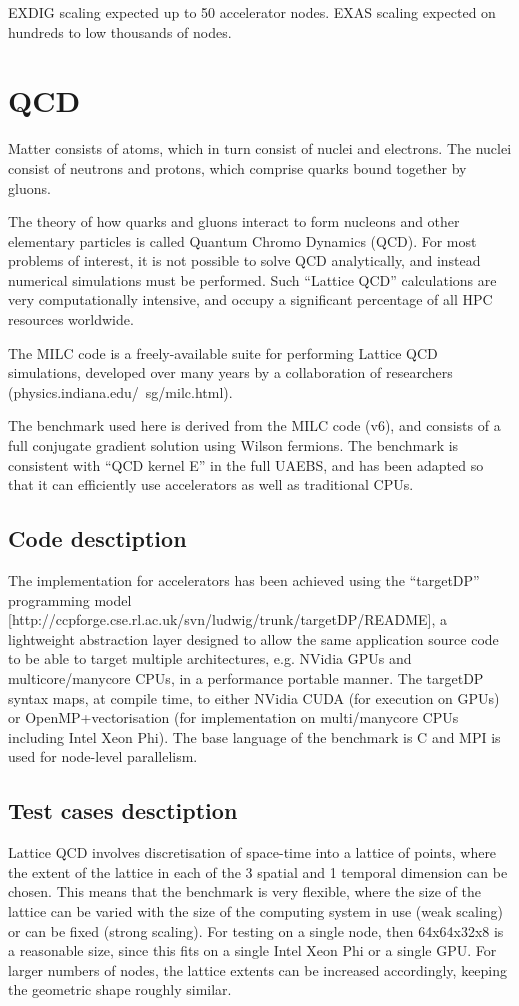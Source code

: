 EXDIG scaling expected up to 50 accelerator nodes. EXAS scaling expected on hundreds to low thousands of nodes.

\section{QCD}

Matter consists of atoms, which in turn consist of nuclei and electrons. The nuclei consist of neutrons and protons, which comprise quarks bound together by gluons.

The theory of how quarks and gluons interact to form nucleons and other elementary particles is called Quantum Chromo Dynamics (QCD). For most problems of interest, it is not possible to solve QCD analytically, and instead numerical simulations must be performed. Such “Lattice QCD” calculations are very computationally intensive, and occupy a significant percentage of all HPC resources worldwide.

The MILC code is a freely-available suite for performing Lattice QCD simulations, developed over many years by a collaboration of researchers (physics.indiana.edu/~sg/milc.html).

The benchmark used here is derived from the MILC code (v6), and consists of a full conjugate gradient solution using Wilson fermions. The benchmark is consistent with “QCD kernel E” in the full UAEBS, and has been adapted so that it can efficiently use accelerators as well as traditional CPUs.

\subsection{Code desctiption}
The implementation for accelerators has been achieved using the “targetDP” programming model [http://ccpforge.cse.rl.ac.uk/svn/ludwig/trunk/targetDP/README], a lightweight abstraction layer designed to allow the same application source code to be able to target multiple architectures, e.g. NVidia GPUs and multicore/manycore CPUs, in a performance portable manner. The targetDP syntax maps, at compile time, to either NVidia CUDA (for execution on GPUs) or OpenMP+vectorisation (for implementation on multi/manycore CPUs including Intel Xeon Phi). The base language of the benchmark is C and MPI is used for node-level parallelism.

\subsection{Test cases desctiption}
Lattice QCD involves discretisation of space-time into a lattice of points, where the extent of the lattice in each of the 3 spatial and 1 temporal dimension can be chosen. This means that the benchmark is very flexible, where the size of the lattice can be varied with the size of the computing system in use (weak scaling) or can be fixed (strong scaling). For testing on a single node, then 64x64x32x8 is a reasonable size, since this fits on a single Intel Xeon Phi or a single GPU. For larger numbers of nodes, the lattice extents can be increased accordingly, keeping the geometric shape roughly similar.


